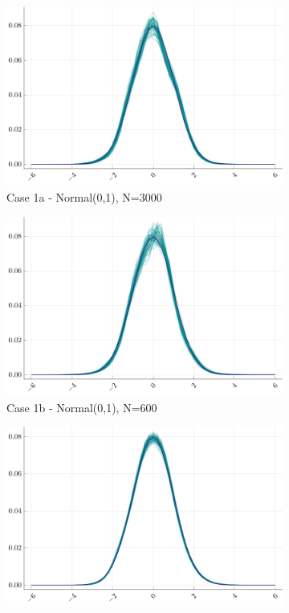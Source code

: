 \begin{figure}[H]
	\centering
	\begin{subfigure}[t]{.4\textwidth}
		\centering
		\includegraphics[width=\linewidth]{Figures/1a/W.pdf}
		\caption{Case 1a - Normal(0,1), N=3000} 
	\end{subfigure}
	\begin{subfigure}[t]{.4\textwidth}
		\centering
		\includegraphics[width=\linewidth]{Figures/1b/W.pdf}
		\caption{Case 1b - Normal(0,1), N=600} 
	\end{subfigure}
	\vspace{20px}
	\begin{subfigure}[t]{.4\textwidth}
		\centering
		\includegraphics[width=\linewidth]{Figures/1c/W.pdf}

\end{subfigure}
\end{figure}
